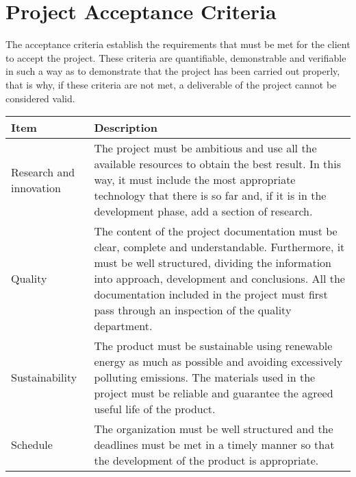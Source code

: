 \section{Project Acceptance Criteria}

The acceptance criteria establish the requirements that must be met for the client to accept the project. These criteria are quantifiable, demonstrable and verifiable in such a way as to demonstrate that the project has been carried out properly, that is why, if these criteria are not met, a deliverable of the project cannot be considered valid.

\begin{longtable}[H]{lp{10.2cm}}
	
	\toprule[2pt]
	
	\textbf{Item} & \textbf{Description} \\
	
	\midrule[1.5pt] 
	\endhead
	
	Research and innovation & The project must be ambitious and use all the available resources to obtain the best result. In this way, it must include the most appropriate technology that there is so far and, if it is in the development phase, add a section of research.\vspace{0.2cm} \\
	
	\midrule
	
	Quality & The content of the project documentation must be clear, complete and understandable. Furthermore, it must be well structured, dividing the information into approach, development and conclusions.\vspace{0.2cm}
	\newline
	All the documentation included in the project must first pass through an inspection of the quality department.\vspace{0.2cm} \\
	
	\midrule
	
	Sustainability & The product must be sustainable using renewable energy as much as possible and avoiding excessively polluting emissions. The materials used in the project must be reliable and guarantee the agreed useful life of the product.\vspace{0.2cm} \\
	
	\midrule	
	
	Schedule & The organization must be well structured and the deadlines must be met in a timely manner so that the development of the product is appropriate.\vspace{0.2cm} \\
	

\end{longtable}
